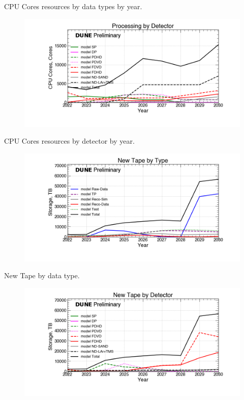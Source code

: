 \begin{table}[h]
\label{tab:CPU Cores_Types}
\caption{CPU Cores resources by data types by year.}
\end{table}
\pagebreak
\begin{figure}[ht]
\centering\includegraphics[height=0.4\textwidth]{NearTerm_2024-08-14-2030_noMWC_Processing-by-Detector-CPU-Cores.png}\end{figure}
\begin{table}[h]
\label{tab:CPU Cores_Detectors}
\caption{CPU Cores resources by detector by year.}
\end{table}
\pagebreak
\begin{figure}[ht]
\centering\includegraphics[height=0.4\textwidth]{NearTerm_2024-08-14-2030_noMWC_New-Tape-by-Type-Storage.png}\end{figure}
\begin{table}[h]
\label{tab:TapeByYearByType}
\caption{New Tape by data type.}
\end{table}
\pagebreak
\begin{figure}[ht]
\centering\includegraphics[height=0.4\textwidth]{NearTerm_2024-08-14-2030_noMWC_New-Tape-by-Detector-Storage.png}\end{figure}
